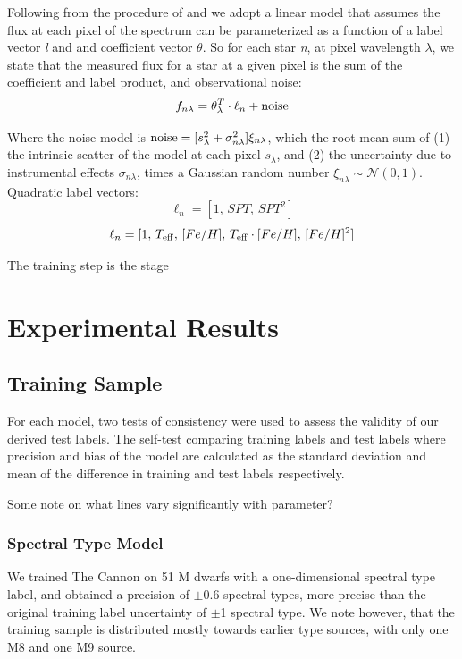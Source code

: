 \documentclass[modern]{aastex62}
\begin{document}
Following from the procedure of \citealt{Ness:2015} and \citealt{Ho:2017a} we adopt a linear model that assumes the flux at each pixel of the spectrum can be parameterized as a function of a label vector \emph{l} and and coefficient vector \emph{$\theta$}. So for each star \emph{n}, at pixel wavelength \emph{$\lambda$}, we state that the measured flux for a star at a given pixel is the sum of the coefficient and label product, and observational noise:
\begin{equation}
	f_{n\lambda} = \theta_{\lambda}^{T} \cdot \ell_{n} + {\rm noise}
\end{equation}

Where the noise model is ${\rm noise}=[s_{\lambda}^2 + \sigma_{n\lambda}^2]\xi_{n\lambda}$, which the root mean sum of (1) the intrinsic scatter of the model at each pixel \emph{$s_{\lambda}$}, and (2) the uncertainty due to instrumental effects \emph{$\sigma_{n\lambda}$}, times a Gaussian random number $\xi_{n\lambda} \sim \mathcal{N} (0,1)$. Quadratic label vectors:
	\[\ell_{n} = [1, \, SPT, \, SPT^{2}] \]
	\[\ell_{n} = [1, \, T_{\rm eff}, \, [Fe/H], \, T_{\rm eff} \cdot [Fe/H], \, [Fe/H]^{2}] \]

The training step is the stage 


\section{Experimental Results} \label{sec:results}

\subsection{Training Sample}

For each model, two tests of consistency were used to assess the validity of our derived test labels. The self-test comparing training labels and test labels where precision and bias of the model are calculated as the standard deviation and mean of the difference in training and test labels respectively. 

Some note on what lines vary significantly with parameter?

\subsubsection{Spectral Type Model}
We trained The Cannon on 51 M dwarfs with a one-dimensional spectral type label, and obtained a precision of $\pm$0.6 spectral types, more precise than the original training label uncertainty of $\pm$1 spectral type. We note however, that the training sample is distributed mostly towards earlier type sources, with only one M8 and one M9 source.
\end{document}

